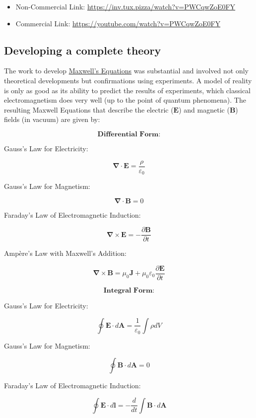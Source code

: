 \begin{itemize}
\tightlist
\item
  Non-Commercial Link: \url{https://inv.tux.pizza/watch?v=PWCqwZoE0FY}
\item
  Commercial Link: \url{https://youtube.com/watch?v=PWCqwZoE0FY}
\end{itemize}

\subsection{Developing a complete
theory}\label{developing-a-complete-theory}

The work to develop
\href{https://en.wikipedia.org/wiki/Maxwell\%27s_equations}{Maxwell's
Equations} was substantial and involved not only theoretical
developments but confirmations using experiments. A model of reality is
only as good as its ability to predict the results of experiments, which
classical electromagnetism does very well (up to the point of quantum
phenomena). The resulting Maxwell Equations that describe the electric
(\(\mathbf{E}\)) and magnetic (\(\mathbf{B}\)) fields (in vacuum) are
given by:

\[
\textbf{Differential Form:}
\]

Gauss's Law for Electricity:

\[
\mathbf{\nabla} \cdot \mathbf{E} = \frac{\rho}{\varepsilon_0}
\]

Gauss's Law for Magnetism:

\[
\mathbf{\nabla} \cdot \mathbf{B} = 0
\]

Faraday's Law of Electromagnetic Induction:

\[
\mathbf{\nabla} \times \mathbf{E} = -\frac{\partial \mathbf{B}}{\partial t}
\]

Ampère's Law with Maxwell's Addition:

\[
\mathbf{\nabla} \times \mathbf{B} = \mu_0 \mathbf{J} + \mu_0 \varepsilon_0 \frac{\partial \mathbf{E}}{\partial t}
\]

\[
\textbf{Integral Form:}
\]

Gauss's Law for Electricity:

\[
\oint \mathbf{E} \cdot d\mathbf{A} = \frac{1}{\varepsilon_0} \int \rho dV
\]

Gauss's Law for Magnetism:

\[
\oint \mathbf{B} \cdot d\mathbf{A} = 0
\]

Faraday's Law of Electromagnetic Induction:

\[
\oint \mathbf{E} \cdot d\mathbf{l} = -\frac{d}{dt} \int \mathbf{B} \cdot d\mathbf{A}
\]

